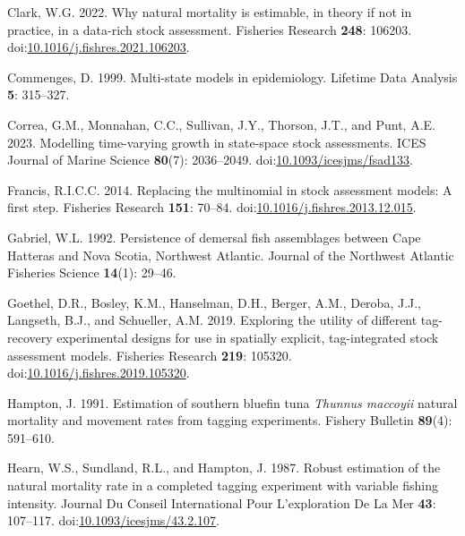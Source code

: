 \documentclass[
]{article}
\newlength{\cslhangindent}
\newlength{\cslentryspacingunit} %
\newenvironment{CSLReferences}[2] %
 {%
  \setlength{\parindent}{0pt}
  \ifodd #1
  \let\oldpar\par
  \def\par{\hangindent=\cslhangindent\oldpar}
  \fi
  \setlength{\parskip}{#2\cslentryspacingunit}
 }%
 {}
\begin{document}
\begin{CSLReferences}{1}{0}
\leavevmode{}%
Clark, W.G. 2022. Why natural mortality is estimable, in theory if not
in practice, in a data-rich stock assessment. Fisheries Research
\textbf{248}: 106203.
doi:\href{https://doi.org/10.1016/j.fishres.2021.106203}{10.1016/j.fishres.2021.106203}.

\leavevmode{}%
Commenges, D. 1999. Multi-state models in epidemiology. Lifetime Data
Analysis \textbf{5}: 315--327.

\leavevmode{}%
Correa, G.M., Monnahan, C.C., Sullivan, J.Y., Thorson, J.T., and Punt,
A.E. 2023. Modelling time-varying growth in state-space stock
assessments. ICES Journal of Marine Science \textbf{80}(7): 2036--2049.
doi:\href{https://doi.org/10.1093/icesjms/fsad133}{10.1093/icesjms/fsad133}.

\leavevmode{}%
Francis, R.I.C.C. 2014. Replacing the multinomial in stock assessment
models: A first step. Fisheries Research \textbf{151}: 70--84.
doi:\href{https://doi.org/10.1016/j.fishres.2013.12.015}{10.1016/j.fishres.2013.12.015}.

\leavevmode{}%
Gabriel, W.L. 1992. Persistence of demersal fish assemblages between
{C}ape {H}atteras and {N}ova {S}cotia, {N}orthwest {A}tlantic. Journal
of the Northwest Atlantic Fisheries Science \textbf{14}(1): 29--46.

\leavevmode{}%
Goethel, D.R., Bosley, K.M., Hanselman, D.H., Berger, A.M., Deroba,
J.J., Langseth, B.J., and Schueller, A.M. 2019. Exploring the utility of
different tag-recovery experimental designs for use in spatially
explicit, tag-integrated stock assessment models. Fisheries Research
\textbf{219}: 105320.
doi:\href{https://doi.org/10.1016/j.fishres.2019.105320}{10.1016/j.fishres.2019.105320}.

\leavevmode{}%
Hampton, J. 1991. Estimation of southern bluefin tuna \emph{{T}hunnus
maccoyii} natural mortality and movement rates from tagging experiments.
Fishery Bulletin \textbf{89}(4): 591--610.

\leavevmode{}%
Hearn, W.S., Sundland, R.L., and Hampton, J. 1987. Robust estimation of
the natural mortality rate in a completed tagging experiment with
variable fishing intensity. Journal Du Conseil International Pour
L'exploration De La Mer \textbf{43}: 107--117.
doi:\href{https://doi.org/10.1093/icesjms/43.2.107}{10.1093/icesjms/43.2.107}.


\end{CSLReferences}
\end{document}
